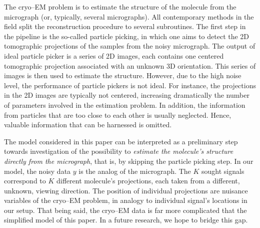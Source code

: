 \documentclass[english,11pt]{article}
\numberwithin{equation}{section}
\theoremstyle{plain}
\theoremstyle{definition}
\theoremstyle{remark}
\theoremstyle{plain}
\theoremstyle{remark}
\theoremstyle{plain}
\theoremstyle{plain}
\begin{document}
The cryo--EM problem is to estimate the structure of the molecule from the micrograph (or, typically, several micrographs). 
All contemporary methods in the field split the reconstruction procedure to several subroutines. 
The first step in the pipeline is the so-called particle picking, in which one aims to detect the 2D tomographic projections of the samples from the noisy micrograph. The output of ideal particle picker is a series of 2D images, each contains one centered tomographic projection associated with an unknown 3D orientation. This series of images 
 is then used to estimate the structure. 
However, due to the high noise level, the performance of particle pickers  is not ideal. For instance, the projections in the 2D images are typically not centered, increasing dramatically the number of parameters involved in the estimation problem. In addition, the information from particles that are too close to each other is usually neglected. Hence, valuable information that can be harnessed is omitted. 

The model considered in this paper can be interpreted as a preliminary step towards investigation of the possibility to \emph{estimate the molecule's structure directly from the micrograph}, that is, by skipping the particle picking step. 
In our model, the noisy data $y$ is the analog of the micrograph. The $K$ sought signals correspond to $K$ different molecule's projections, each taken from  a different, unknown, viewing direction. %
The position of individual projections are  nuisance variables of the cryo--EM problem, in analogy to individual signal's locations in our setup.
That being said, the cryo--EM data is far more complicated that the simplified model of this paper. In a future research, we hope to bridge this gap.
 
%



\end{document}
